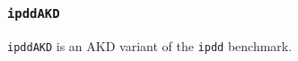 \subsubsection{\tt ipddAKD}
\label{benchmarkipddAKD}

{\tt ipddAKD} is an AKD variant of the {\tt ipdd} benchmark.
